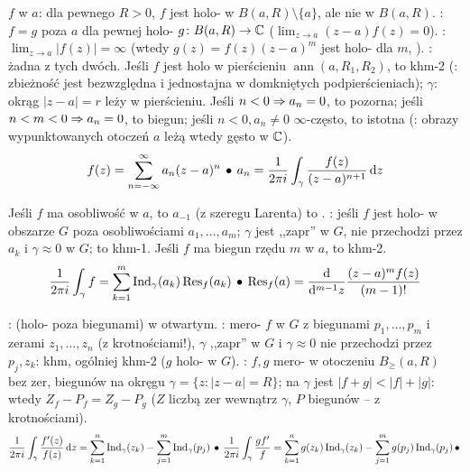   $f$ w $a$: dla pewnego $R >0$, $f$ jest holo- w $B(a, R) \setminus \{a\}$, ale nie w $B(a,R)$.
: $f=g$ poza $a$ dla pewnej holo- $g \colon B(a,R) \to \mathbb{C}$ ($\lim_{z \to a} (z-a) f(z) = 0$). 
: $\lim_{z \to a} |f(z)| = \infty$ (wtedy $g(z) = f(z) (z-a)^m$ jest holo- dla $m$, ). 
: żadna z tych dwóch.
Jeśli $f$ jest holo w pierścieniu $\operatorname{ann}(a,R_1, R_2)$, to khm-2 (: zbieżność jest bezwzględna i jednostajna w domkniętych podpierścieniach); $\gamma$: okrąg $|z-a| = r$ leży w pierścieniu.
Jeśli $n < 0 \Rightarrow a_n = 0$, to pozorna; jeśli $n < m < 0 \Rightarrow a_n = 0$, to biegun; jeśli $n < 0, a_n \neq 0$ $\infty$-często, to istotna (: obrazy wypunktowanych otoczeń $a$ leżą wtedy gęsto w $\mathbb{C}$).
\[
	f(z) = \sum_{n= -\infty}^\infty a_n(z-a)^n \, \bullet \,
	a_n = \frac{1}{2\pi i} \int_\gamma \frac{f(z)} {(z-a)^{n+1}} \,\textrm{d} z
\]


Jeśli $f$  ma osobliwość w $a$, to $a_{-1}$ (z szeregu Larenta) to .
: jeśli $f$ jest holo- w obszarze $G$ poza osobliwościami $a_1, \dots, a_m$; $\gamma$ jest ,,zapr'' w $G$, nie przechodzi przez $a_k$ i $\gamma \approx 0$ w $G$; to khm-1.
Jeśli $f$ ma biegun rzędu $m$ w $a$, to khm-2.
\[
	\frac{1}{2\pi i}\int_\gamma f = \sum_{k=1}^m \operatorname{Ind}_\gamma (a_k) \operatorname{Res}_f( a_k) \, \bullet \,
	\operatorname{Res}_f(a)= \frac{\textrm{d}{}}{\textrm{d}{}^{m-1} z} \frac{(z-a)^m f(z)}{(m-1)!}
\]

:  (holo- poza biegunami) w otwartym.
: mero- $f$ w $G$ z biegunami $p_1, \dots, p_m$ i zerami $z_1, \dots, z_n$ (z krotnościami!), $\gamma$ ,,zapr'' w $G$ i $\gamma \approx 0$ nie przechodzi przez $p_j, z_k$: khm, ogólniej khm-2 ($g$ holo- w $G$).
: $f, g$ mero- w otoczeniu $B_\ge (a, R)$ bez zer, biegunów na okręgu $\gamma = \{z : |z-a| = R\}$; na $\gamma$ jest $|f+ g| < |f| + |g|$: wtedy $Z_f - P_f = Z_g-P_g$ ($Z$ liczbą zer wewnątrz $\gamma$, $P$ biegunów -- z krotnościami).
\[
	\frac{1}{2\pi i} \int_\gamma \frac{f'(z)}{f(z)} \,\textrm{d} z = \sum_{k=1}^n \operatorname{Ind}_\gamma (z_k)- \sum_{j=1}^m \operatorname{Ind}_\gamma(p_j) \, \bullet \,
	\frac{1}{2\pi i} \int_\gamma  \frac{gf'}{f}  = \sum_{k=1}^n g(z_k) \operatorname{Ind}_\gamma(z_k) - \sum_{j=1}^m g(p_j) \operatorname{Ind}_\gamma(p_j)  \, \bullet \,
\]